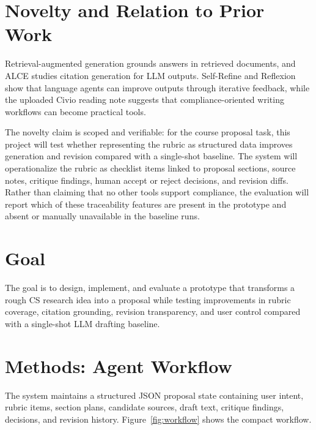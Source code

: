 \documentclass[11pt]{article}
\begin{document}
\section*{Novelty and Relation to Prior Work}
Retrieval-augmented generation grounds answers in retrieved documents, and ALCE studies citation generation for LLM outputs. Self-Refine and Reflexion show that language agents can improve outputs through iterative feedback, while the uploaded Civio reading note suggests that compliance-oriented writing workflows can become practical tools.

The novelty claim is scoped and verifiable: for the course proposal task, this project will test whether representing the rubric as structured data improves generation and revision compared with a single-shot baseline. The system will operationalize the rubric as checklist items linked to proposal sections, source notes, critique findings, human accept or reject decisions, and revision diffs. Rather than claiming that no other tools support compliance, the evaluation will report which of these traceability features are present in the prototype and absent or manually unavailable in the baseline runs.

\section*{Goal}
The goal is to design, implement, and evaluate a prototype that transforms a rough CS research idea into a proposal while testing improvements in rubric coverage, citation grounding, revision transparency, and user control compared with a single-shot LLM drafting baseline.

\section*{Methods: Agent Workflow}
The system maintains a structured JSON proposal state containing user intent, rubric items, section plans, candidate sources, draft text, critique findings, decisions, and revision history. Figure~\ref{fig:workflow} shows the compact workflow.
\end{document}
